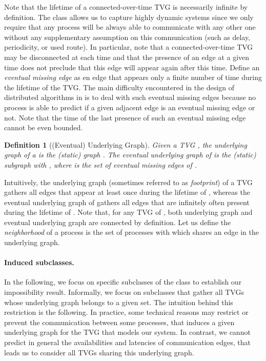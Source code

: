 \documentclass[11pt]{article}
\newtheorem{definition}{Definition}
\begin{document}
Note that the lifetime of a connected-over-time TVG is necessarily infinite by definition. The class  allows us to capture highly dynamic systems since we only require that any process will be always able to communicate with any other one without any supplementary assumption on this communication (such as delay, periodicity, or used route). In particular, note that a connected-over-time TVG may be disconnected at each time and that the presence of an edge at a given time does not preclude that this edge will appear again after this time.  Define an \emph{eventual missing edge} as en edge that appears only a finite number of time during the lifetime of the TVG. The main difficulty encountered in the design of distributed algorithms in  is to deal with such eventual missing edges because no process is able to predict if a given adjacent edge is an eventual missing edge or not. Note that the time of the last presence of such an eventual missing edge cannot be even bounded.

\begin{definition}[(Eventual) Underlying Graph]\label{def:UG}
Given a TVG , the underlying graph of a  is the (static) graph . The eventual underlying graph of  is the (static) subgraph  with , where  is the set of eventual missing edges of . 
\end{definition}

Intuitively, the underlying graph (sometimes referred to as {\em footprint}) of a TVG  gathers all edges that appear at least once during the lifetime of , whereas the eventual underlying graph of  gathers all edges that are infinitely often present during the lifetime of . Note that, for any TVG of , both underlying graph and eventual underlying graph are connected by definition. Let us define the \emph{neighborhood}  of a process  is the set of processes with which  shares an edge in the underlying graph.

\paragraph{Induced subclasses.}

In the following, we focus on specific subclasses of the class  to establish our impossibility result. Informally, we focus on subclasses that gather all TVGs whose underlying graph belongs to a given set. The intuition behind this restriction is the following. In practice, some technical reasons may restrict or prevent the communication between some processes, that induces a given underlying graph for the TVG that models our system. In contrast, we cannot predict in general the availabilities and latencies of communication edges, that leads us to consider all TVGs sharing this underlying graph.
\end{document}
